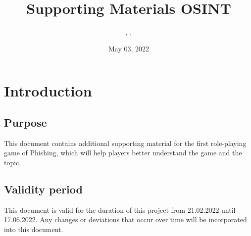 \documentclass{../../../extra/styles/SecureRole}
\title{Supporting Materials OSINT}
\author{\Ba, \Wi, \Zm}
\date{May 03, 2022}
\begin{document}
\makecover
\newpage

\tableofcontents
\newpage

\chapter{Introduction}

\section{Purpose}
This document contains additional supporting material for the first role-playing game of Phishing, which will help players better understand the game and the topic.

\section{Validity period}

This document is valid for the duration of this project from 21.02.2022 until 17.06.2022. Any changes or deviations that occur over time will be incorporated into this document.


\end{document}
